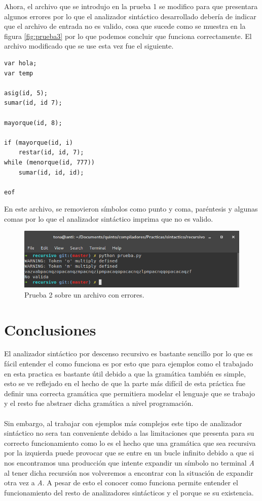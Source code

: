 \documentclass[12pt, titlepage]{article}
\begin{document}
Ahora, el archivo que se introdujo en la prueba 1 se modifico para que 
presentara algunos errores por lo que el analizador sintáctico desarrollado 
debería de indicar que el archivo de entrada no es valido, cosa que sucede como 
se muestra en la figura \ref{fig:prueba3} por lo que podemos concluir que 
funciona correctamente. El archivo modificado que se use esta vez fue el 
siguiente.
\begin{lstlisting}
var hola;
var temp

asig(id, 5);
sumar(id, id 7);

mayorque(id, 8);

if (mayorque(id, i)
    restar(id, id, 7);
while (menorque(id, 777))
    sumar(id, id, id);

eof
\end{lstlisting}
En este archivo, se removieron símbolos como punto y coma, paréntesis y algunas 
comas por lo que el analizador sintáctico imprima que no es valido.

\begin{figure}[H]
    \begin{center}
    \includegraphics[width=15cm]{prueba2.png}
    \caption{Prueba 2 sobre un archivo con errores.}
    \label{fig:prueba2}
    \end{center}
\end{figure}
\section{Conclusiones}
El analizador sintáctico por descenso recursivo es bastante sencillo por lo que 
es fácil entender el como funciona es por esto que para ejemplos como el 
trabajado en esta 
practica es bastante útil debido a que la gramática también es simple, esto se 
ve 
reflejado en el hecho de que la parte más difícil de esta práctica fue definir 
una correcta gramática que permitiera modelar el lenguaje que se trabajo y el 
resto fue abstraer dicha gramática a nivel programación.
\\\\
Sin embargo, al trabajar con ejemplos más complejos este tipo de analizador 
sintáctico no sera tan conveniente debido a las limitaciones que presenta para 
su correcto funcionamiento como lo es el hecho que una gramática que sea 
recursiva por la izquierda puede provocar que se entre en un bucle infinito 
debido a que si nos encontramos una producción que intente expandir un símbolo 
no terminal \emph{A} al tener dicha recursión nos volveremos a encontrar con la 
situación de expandir otra vez a \emph{A}.
A pesar de esto el conocer como funciona permite entender el funcionamiento del 
resto de analizadores sintácticos y el porque se su existencia.
 

\end{document}
